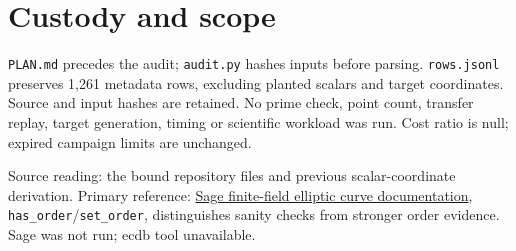 \documentclass[10pt]{article}
\begin{document}
\section*{Custody and scope}
\texttt{PLAN.md} precedes the audit; \texttt{audit.py} hashes inputs before parsing. \texttt{rows.jsonl} preserves 1,261 metadata rows, excluding planted scalars and target coordinates. Source and input hashes are retained. No prime check, point count, transfer replay, target generation, timing or scientific workload was run. Cost ratio is null; expired campaign limits are unchanged.

Source reading: the bound repository files and previous scalar-coordinate derivation. Primary reference: \href{https://doc.sagemath.org/html/en/reference/arithmetic_curves/sage/schemes/elliptic_curves/ell_finite_field.html}{Sage finite-field elliptic curve documentation}, \texttt{has\_order}/\texttt{set\_order}, distinguishes sanity checks from stronger order evidence. Sage was not run; ecdb tool unavailable.
\end{document}
